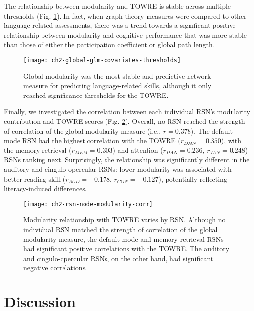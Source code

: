 The relationship between modularity and TOWRE is stable across multiple thresholds (Fig. \ref{fig:ch2-global-glm-covariates-thresh}). In fact, when graph theory measures were compared to other language-related assessments, there was a trend towards a significant positive relationship between modularity and cognitive performance that was more stable than those of either the participation coefficient or global path length. 

\begin{figure}[t]
    \centering
    \texttt{[image: ch2-global-glm-covariates-thresholds]}
    \caption[Modularity metrics at rest are the best predictors of cognitive skills.] {Global modularity was the most stable and predictive network measure for predicting language-related skills, although it only reached significance thresholds for the TOWRE.}
    \label{fig:ch2-global-glm-covariates-thresh}
\end{figure}

Finally, we investigated the correlation between each individual RSN's modularity contribution and TOWRE scores (Fig. \ref{fig:ch2-rsn-node-modularity-corr}). Overall, no RSN reached the strength of correlation of the global modularity measure (i.e., $r = 0.378$). The default mode RSN had the highest correlation with the TOWRE ($r_{DMN} = 0.350$), with the memory retrieval ($r_{MEM} = 0.303$) and attention ($r_{DAN} = 0.236$, $r_{VAN} = 0.248$) RSNs ranking next. Surprisingly, the relationship was significantly different in the auditory and cingulo-opercular RSNs: lower modularity was associated with better reading skill ($r_{AUD} = -0.178$, $r_{CON} = -0.127$), potentially reflecting literacy-induced differences.

\begin{figure}[t]
    \centering
    \texttt{[image: ch2-rsn-node-modularity-corr]}
    \caption[Modularity relationship with TOWRE varies by RSN.] {Modularity relationship with TOWRE varies by RSN. Although no individual RSN matched the strength of correlation of the global modularity measure, the default mode and memory retrieval RSNs had significant positive correlations with the TOWRE. The auditory and cingulo-opercular RSNs, on the other hand, had significant negative correlations.}
    \label{fig:ch2-rsn-node-modularity-corr}
\end{figure}

\section{Discussion}

